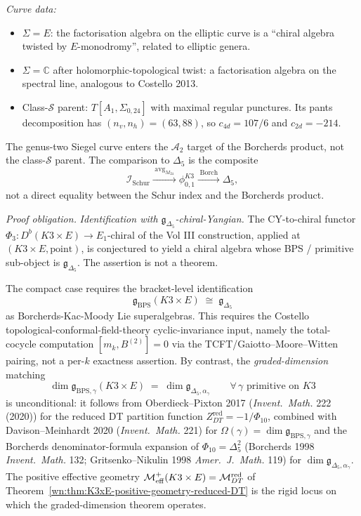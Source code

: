 \emph{Curve data:}
\begin{itemize}
\item $\Sigma = E$: the factorisation algebra on the elliptic curve is a ``chiral
algebra twisted by $E$-monodromy'', related to elliptic genera.
\item $\Sigma = \mathbb{C}$ after holomorphic-topological twist: a factorisation
algebra on the spectral line, analogous to Costello 2013.
\item Class-$\mathcal S$ parent:
$T[A_1,\Sigma_{0,24}]$ with maximal regular punctures.  Its pants
decomposition has $(n_v,n_h)=(63,88)$, so
$c_{4d}=107/6$ and $c_{2d}=-214$.
\end{itemize}
The genus-two Siegel curve enters the $\mathcal A_2$ target of the
Borcherds product, not the class-$\mathcal S$ parent.  The comparison
to $\Delta_5$ is the composite
\[
\mathcal I_{\mathrm{Schur}}
\xrightarrow{\;\operatorname{avg}_{M_{24}}\;}
\phi^{K3}_{0,1}
\xrightarrow{\;\mathrm{Borch}\;}
\Delta_5,
\]
not a direct equality between the Schur index and the Borcherds product.

\emph{Proof obligation.} \emph{Identification with $\mathfrak{g}_{\Delta_5}$-chiral-Yangian.}
The CY-to-chiral functor $\Phi_3: D^b(K3 \times E) \to E_1\text{-chiral}$ of the Vol III
construction, applied at $(K3 \times E,\mathrm{point})$, is conjectured
to yield a chiral algebra whose BPS / primitive sub-object is
$\mathfrak{g}_{\Delta_5}$. The assertion is not a theorem.

\begin{remark}
\label{wn:rem:K3xE-bracket-obligation}
The compact case requires the bracket-level identification
\[
\mathfrak{g}_{\mathrm{BPS}}(K3 \times E) \;\cong\; \mathfrak{g}_{\Delta_5}
\]
as Borcherds-Kac-Moody Lie superalgebras. This requires the
Costello topological-conformal-field-theory cyclic-invariance input,
namely the total-cocycle computation
$[m_k,B^{(2)}]=0$ via the TCFT/Gaiotto--Moore--Witten pairing, not a
per-$k$ exactness assertion.
By contrast, the \emph{graded-dimension} matching
\[
\dim \mathfrak{g}_{\mathrm{BPS}, \gamma}(K3 \times E)
\;=\; \dim \mathfrak{g}_{\Delta_5, \alpha_\gamma}
\qquad \forall\,\gamma\text{ primitive on }K3
\]
is unconditional: it follows from Oberdieck--Pixton 2017 (\emph{Invent.\ Math.} 222
(2020)) for the reduced DT partition function
$Z^{\mathrm{red}}_{DT} = -1/\Phi_{10}$, combined with Davison--Meinhardt 2020
(\emph{Invent.\ Math.} 221) for $\Omega(\gamma) = \dim \mathfrak{g}_{\mathrm{BPS},\gamma}$
and the Borcherds denominator-formula expansion of $\Phi_{10} = \Delta_5^2$
(Borcherds 1998 \emph{Invent.\ Math.} 132; Gritsenko--Nikulin 1998
\emph{Amer.\ J.\ Math.} 119) for $\dim \mathfrak{g}_{\Delta_5, \alpha_\gamma}$.
The positive effective geometry $\mathcal{M}^+_{\mathrm{eff}}(K3 \times E) = \mathcal{M}^{\mathrm{red}}_{DT}$ of
Theorem~\ref{wn:thm:K3xE-positive-geometry-reduced-DT} is the rigid locus on which the
graded-dimension theorem operates.
\end{remark}

